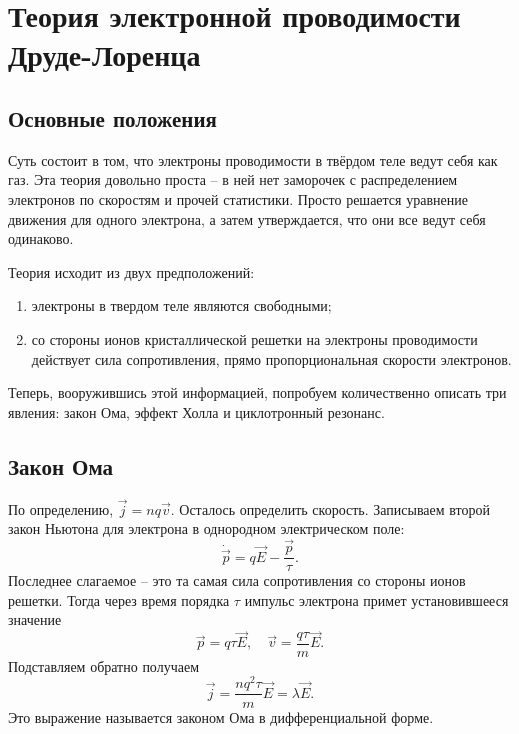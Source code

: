 \section{Теория электронной проводимости Друде-Лоренца}
\subsection{Основные положения}

Суть состоит в том, что электроны проводимости в твёрдом теле ведут себя как
газ. Эта теория довольно проста -- в ней нет заморочек с распределением
электронов по скоростям и прочей статистики. Просто решается уравнение движения
для одного электрона, а затем утверждается, что они все ведут себя одинаково.

Теория исходит из двух предположений:
\begin{enumerate}
    \item электроны в твердом теле являются свободными;
    \item со стороны ионов кристаллической решетки на электроны проводимости
    действует сила сопротивления, прямо пропорциональная скорости электронов.
\end{enumerate}

Теперь, вооружившись этой информацией, попробуем количественно описать три
явления: закон Ома, эффект Холла и циклотронный резонанс.

\subsection{Закон Ома}
    По определению, \( \vec{j} = nq\vec{v} \). Осталось определить скорость.
    Записываем второй закон Ньютона для электрона в однородном электрическом
    поле:
    \[
        \dot{\vec{p}} = q\vec{E} - \frac{\vec{p}}{\tau}.
    \]
    Последнее слагаемое -- это та самая сила сопротивления со стороны ионов
    решетки. Тогда через время порядка \( \tau \) импульс электрона примет
    установившееся значение
    \[
        \vec{p} = q\tau\vec{E},\quad \vec{v} = \frac{q\tau}{m}\vec{E}.
    \]
    Подставляем обратно получаем
    \[
        \vec{j} = \frac{nq^2\tau}{m}\vec{E} = \lambda\vec{E}.
    \]
    Это выражение называется законом Ома в дифференциальной форме.

